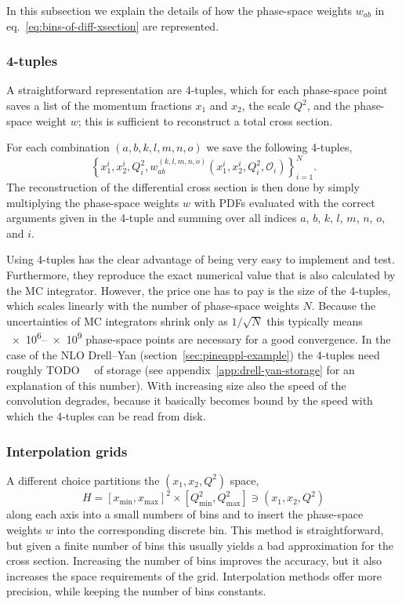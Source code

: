 In this subsection we explain the details of how the phase-space weights $w_{ab}$ in eq.~\eqref{eq:bins-of-diff-xsection} are represented.

\subsubsection{4-tuples}

A straightforward representation are 4-tuples, which for each phase-space point saves a list of the momentum fractions $x_1$ and $x_2$, the scale $Q^2$, and the phase-space weight $w$; this is sufficient to reconstruct a total cross section.

For each combination $(a,b,k,l,m,n,o)$ we save the following 4-tuples,
\begin{equation}
\left\{ x_1^i, x_2^i, Q^2_i, w^{(k,l,m,n,o)}_{ab} (x_1^i, x_2^i, Q^2_i, \mathcal{O}_i) \right\}_{i=1}^N \text{.} \label{eq:four-tuples}
\end{equation}
The reconstruction of the differential cross section is then done by simply multiplying the phase-space weights $w$ with PDFs evaluated with the correct arguments given in the 4-tuple and summing over all indices $a$, $b$, $k$, $l$, $m$, $n$, $o$, and $i$.

Using 4-tuples has the clear advantage of being very easy to implement and test.
Furthermore, they reproduce the exact numerical value that is also calculated by the MC integrator.
However, the price one has to pay is the size of the 4-tuples, which scales linearly with the number of phase-space weights $N$.
Because the uncertainties of MC integrators shrink only as $1/\sqrt{N}$ this typically means \numrange{e6}{e9} phase-space points are necessary for a good convergence.
In the case of the NLO Drell--Yan (section~\ref{sec:pineappl-example}) the 4-tuples need roughly TODO~\si{\giga\byte} of storage (see appendix~\ref{app:drell-yan-storage} for an explanation of this number).
With increasing size also the speed of the convolution degrades, because it basically becomes bound by the speed with which the 4-tuples can be read from disk.

\subsubsection{Interpolation grids}

A different choice partitions the $(x_1, x_2, Q^2)$ space,
\begin{equation}
H = [x_\mathrm{min},x_\mathrm{max}]^2 \times [Q^2_\mathrm{min}, Q^2_\mathrm{max}] \ni (x_1, x_2, Q^2)
\end{equation}
along each axis into a small numbers of bins and to insert the phase-space weights $w$ into the corresponding discrete bin.
This method is straightforward, but given a finite number of bins this usually yields a bad approximation for the cross section.
Increasing the number of bins improves the accuracy, but it also increases the space requirements of the grid.
Interpolation methods offer more precision, while keeping the number of bins constants.

